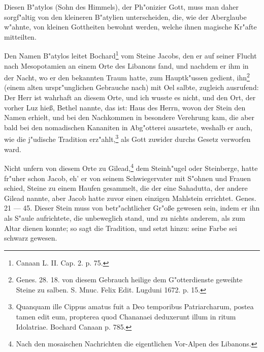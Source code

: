\documentclass[a4paper, 11pt, oneside, polutonikogreek, german]{article}
\begin{document}
Diesen B"atylos (Sohn des Himmels), der Ph"onizier Gott, muss man daher sorgf"altig von den kleineren B"atylien unterscheiden, die, wie der Aberglaube w"ahnte, von kleinen Gottheiten bewohnt werden, welche ihnen magische Kr"afte mitteilten.

Den Namen B"atylos leitet Bochard\footnote{Canaan L. II. Cap. 2. p. 75.} vom Steine Jacobs, den er auf seiner Flucht nach Mesopotamien an einem Orte des Libanons fand, und nachdem er ihm in der Nacht, wo er den bekannten Traum hatte, zum Hauptk"ussen gedient, ihn\footnote{Genes. 28. 18. von diesem Gebrauch heilige dem G"otterdienste geweihte Steine zu salben. S. Mnuc. Felix Edit. Lugduni 1672. p. 15.} (einem alten urspr"unglichen Gebrauche nach) mit Oel salbte, zugleich ausrufend: Der Herr ist wahrhaft an diesem Orte, und ich wusste es nicht, und den Ort, der vorher Luz hieß, Bethel nannte, das ist: Haus des Herrn, wovon der Stein den Namen erhielt, und bei den Nachkommen in besondere Verehrung kam, die aber bald bei den nomadischen Kananiten in Abg"otterei ausartete, weshalb er auch, wie die j"udische Tradition erz"ahlt,\footnote{Quanquam ille Cippus amatus fuit a Deo temporibus Patriarcharum, postea tamen edit eum, propterea quod Chananaei deduxerunt illum in ritum Idolatriae. Bochard Canaan p. 785.} als Gott zuwider durchs Gesetz verworfen ward.

Nicht unfern von diesem Orte zu Gilead,\footnote{Nach den mosaischen Nachrichten die eigentlichen Vor-Alpen des Libanons.} dem Steinh"ugel oder Steinberge, hatte fr"uher schon Jacob, eh' er von seinem Schwiegervater mit S"ohnen und Frauen schied, Steine zu einem Haufen gesammelt, die der eine Sahadutta, der andere Gilead nannte, aber Jacob hatte zuvor einen einzigen Mahlstein errichtet. Genes. 21 --- 45. Dieser Stein muss von betr"achtlicher Gr"oße gewesen sein, indem er ihn als S"aule aufrichtete, die unbeweglich stand, und zu nichts anderem, als zum Altar dienen konnte; so sagt die Tradition, und setzt hinzu: seine Farbe sei schwarz gewesen.
\end{document}
